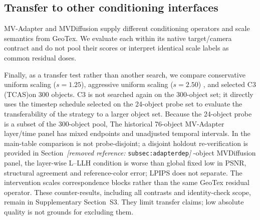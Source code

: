 \documentclass[times,twocolumn,final]{elsarticle}
\providecommand{\DIFadd}[1]{{\protect\color{blue} \sf #1}} %
\providecommand{\DIFdel}[1]{{\protect\color{red} \scriptsize #1}} %
\providecommand{\DIFaddbegin}{} %
\providecommand{\DIFaddend}{} %
\providecommand{\DIFdelbegin}{} %
\providecommand{\DIFdelend}{} %
\begin{document}
\DIFdelbegin %

\DIFdelend \DIFaddbegin \subsection{Transfer to other conditioning interfaces}
\label{subsec:cross-interface}
\DIFadd{MV-Adapter and MVDiffusion supply different conditioning operators and scale semantics from GeoTex. We evaluate each within its native target/camera contract and do not pool their scores or interpret identical scale labels as common residual doses.
}\DIFaddend 

\DIFdelbegin \DIFdel{Finally, as a transfer test rather than another search, we compare conservative uniform scaling ($s = 1.25$), aggressive uniform scaling ($s = 2.50$) , and selected C3 (TCAS)on 300 objects. C3 is not searched again on the 300-object set; it directly uses the timestep schedule selected on the 24-object probe set to evaluate the transferability of the strategy to a larger object set. Because the 24-object probe is a subset of the 300-object pool, }\DIFdelend \DIFaddbegin \DIFadd{The historical 76-object MV-Adapter layer/time panel has mixed endpoints and unadjusted temporal intervals. In }\DIFaddend the \DIFdelbegin \DIFdel{main-table comparison is not probe-disjoint; a disjoint holdout re-verification is provided in Section~\textit{[removed reference: }\texttt{subsec:adapterdep}\textit{]}}\DIFdelend \DIFaddbegin \DIFadd{75-object MVDiffusion panel, the layer-wise L--LLH condition is worse than global fixed low in PSNR, structural agreement and reference-color error; LPIPS does not separate. The intervention scales correspondence blocks rather than the same GeoTex residual operator. These counter-results, including all contrasts and identity-check scope, remain in Supplementary Section~S3. They limit transfer claims; low absolute quality is not grounds for excluding them}\DIFaddend .
\end{document}
